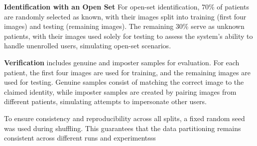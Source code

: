 \textbf{Identification with an Open Set} For open-set identification, 70\% of patients are randomly selected as known, with their images split into training (first four images) and testing (remaining images). The remaining 30\% serve as unknown patients, with their images used solely for testing to assess the system's ability to handle unenrolled users, simulating open-set scenarios. 

\textbf{Verification} includes genuine and imposter samples for evaluation. For each patient, the first four images are used for training, and the remaining images are used for testing. Genuine samples consist of matching the correct image to the claimed identity, while imposter samples are created by pairing images from different patients, simulating attempts to impersonate other users. 

To ensure consistency and reproducibility across all splits, a fixed random seed was used during shuffling. This guarantees that the data partitioning remains consistent across different runs and experimentsss